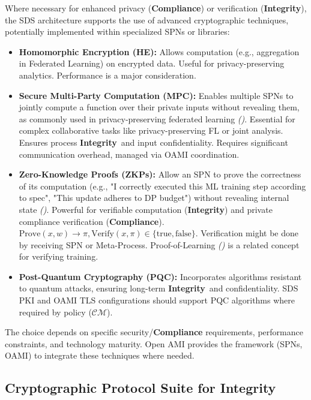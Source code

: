 \documentclass[12pt,a4paper]{report}
\renewcommand{\citep}[1]{\textit{\scriptsize{(\cite{#1})}}}
\newcommand{\Integrity}{\textbf{Integrity}}
\begin{document}
	Where necessary for enhanced privacy (\textbf{Compliance}) or verification (\Integrity), the SDS architecture supports the use of advanced cryptographic techniques, potentially implemented within specialized SPNs or libraries:
	\begin{itemize}[noitemsep]
		\item \textbf{Homomorphic Encryption (HE):} Allows computation (e.g., aggregation in Federated Learning) on encrypted data. Useful for privacy-preserving analytics. Performance is a major consideration.
		\item \textbf{Secure Multi-Party Computation (MPC):} Enables multiple SPNs to jointly compute a function over their private inputs without revealing them, as commonly used in privacy-preserving federated learning \citep{AdditionalCitationRef54}. Essential for complex collaborative tasks like privacy-preserving FL or joint analysis. Ensures process \Integrity\ and input confidentiality. Requires significant communication overhead, managed via OAMI coordination.
		\item \textbf{Zero-Knowledge Proofs (ZKPs):} Allow an SPN to prove the correctness of its computation (e.g., "I correctly executed this ML training step according to spec", "This update adheres to DP budget") without revealing internal state \citep{Peng2025ZKMLSurvey}. Powerful for verifiable computation (\Integrity) and private compliance verification (\textbf{Compliance}). $\text{Prove}(x, w) \rightarrow \pi, \text{Verify}(x, \pi) \in \{\text{true}, \text{false}\}$. Verification might be done by receiving SPN or Meta-Process. Proof-of-Learning \citep{Jia2021ProofOfLearning} is a related concept for verifying training.
		\item \textbf{Post-Quantum Cryptography (PQC):} Incorporates algorithms resistant to quantum attacks, ensuring long-term \Integrity\ and confidentiality. SDS PKI and OAMI TLS configurations should support PQC algorithms where required by policy ($\mathcal{CM}$).
	\end{itemize}
	The choice depends on specific security/\textbf{Compliance} requirements, performance constraints, and technology maturity. Open AMI provides the framework (SPNs, OAMI) to integrate these techniques where needed.
	
	\subsection{Cryptographic Protocol Suite for Integrity} %
	\label{sec:4-3-3} %
	
\end{document}
